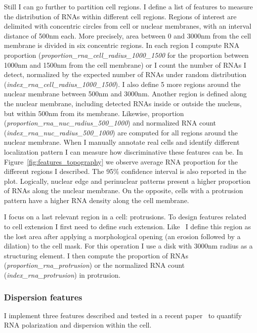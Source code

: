 Still I can go further to partition cell regions.
I define a list of features to measure the distribution of \ac{RNA}s within different cell regions.
Regions of interest are delimited with concentric circles from cell or nuclear membranes, with an interval distance of 500nm each.
More precisely, area between 0 and 3000nm from the cell membrane is divided in six concentric regions.
In each region I compute \ac{RNA} proportion (\emph{proportion\_rna\_cell\_radius\_1000\_1500} for the proportion between 1000nm and 1500nm from the cell membrane) or I count the number of \ac{RNA}s I detect, normalized by the expected number of \ac{RNA}s under random distribution (\emph{index\_rna\_cell\_radius\_1000\_1500}).
I also define 5 more regions around the nuclear membrane between 500nm and 3000nm.
Another region is defined along the nuclear membrane, including detected \ac{RNA}s inside or outside the nucleus, but within 500nm from its membrane.
Likewise, proportion (\emph{proportion\_rna\_nuc\_radius\_500\_1000}) and normalized \ac{RNA} count (\emph{index\_rna\_nuc\_radius\_500\_1000}) are computed for all regions around the nuclear membrane.
When I manually annotate real cells and identify different localization pattern I can measure how discriminative these features can be.
In Figure~\ref{fig:features_topography} we observe average \ac{RNA} proportion for the different regions I described.
The 95\% confidence interval is also reported in the plot.
Logically, nuclear edge and perinuclear patterns present a higher proportion of \ac{RNA}s along the nuclear membrane.
On the opposite, cells with a protrusion pattern have a higher \ac{RNA} density along the cell membrane.

I focus on a last relevant region in a cell: protrusions.
To design features related to cell extension I first need to define such extension.
Like~\cite{samacoits_computational_2018} I define this region as the lost area after applying a morphological opening (an erosion followed by a dilation) to the cell mask.
For this operation I use a disk with 3000nm radius as a structuring element.
I then compute the proportion of \ac{RNA}s (\emph{proportion\_rna\_protrusion}) or the normalized \ac{RNA} count (\emph{index\_rna\_protrusion}) in protrusion.

\subsubsection{Dispersion features}

I implement three features described and tested in a recent paper~\cite{stueland_rdi_2019} to quantify \ac{RNA} polarization and dispersion within the cell.

